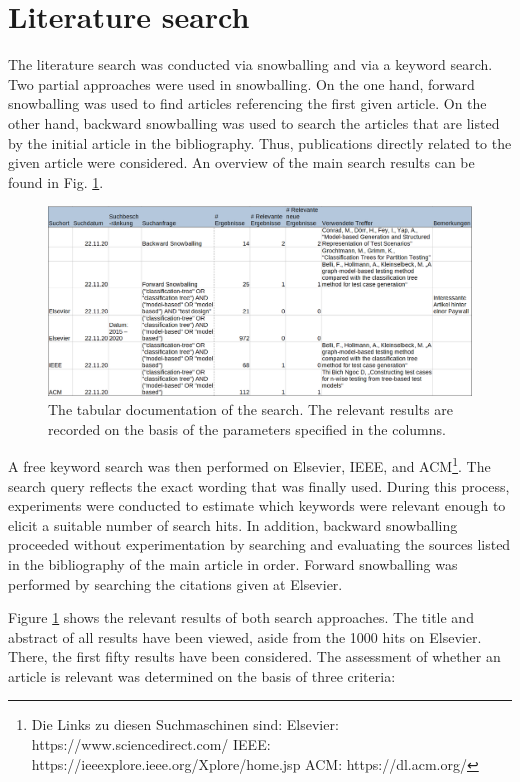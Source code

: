 \section{Literature search}

The literature search was conducted via snowballing and via a keyword search. Two partial approaches were used in snowballing. On the one hand, forward snowballing was used to find articles referencing the first given article. On the other hand, backward snowballing was used to search the articles that are listed by the initial article in the bibliography. Thus, publications directly related to the given article were considered. An overview of the main search results can be found in Fig.  \ref{fig:literature_search}. 

\begin{figure}[H]
\centering
\includegraphics[scale=0.32]{../../individual/groeger/images/Suchdokumentation.png} 
\caption{The tabular documentation of the search. The relevant results are recorded on the basis of the parameters specified in the columns.}
\label{fig:literature_search}
\end{figure}

A free keyword search was then performed on Elsevier, IEEE, and ACM\footnote{Die Links zu diesen Suchmaschinen sind: Elsevier: https://www.sciencedirect.com/ IEEE: https://ieeexplore.ieee.org/Xplore/home.jsp ACM: https://dl.acm.org/ }. The search query reflects the exact wording that was finally used. During this process, experiments were conducted to estimate which keywords were relevant enough to elicit a suitable number of search hits. In addition, backward snowballing proceeded without experimentation by searching and evaluating the sources listed in the bibliography of the main article in order. Forward snowballing was performed by searching the citations given at Elsevier.

Figure \ref{fig:literature_search} shows the relevant results of both search approaches. The title and abstract of all results have been viewed, aside from the 1000 hits on Elsevier. There, the first fifty results have been considered. The assessment of whether an article is relevant was determined on the basis of three criteria:

